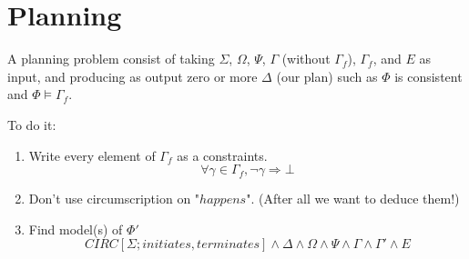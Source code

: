\section{Planning}\label{sec:planning}

A planning problem consist of taking $\Sigma$, $\Omega$, $\Psi$, $\Gamma$ (without $\Gamma_f$), $\Gamma_f$, and $E$ as input,
and producing as output zero or more $\Delta$ (our plan) such as $\Phi$ is consistent and $\Phi\models\Gamma_f$.

To do it:

\begin{enumerate}
  \item Write every element of $\Gamma_f$ as a constraints.
  \begin{equation}
    \tag{$\Gamma '$}
    \forall \gamma \in \Gamma_f, \neg \gamma \Rightarrow \bot
  \end{equation}
  \item Don't use circumscription on "$happens$". (After all we want to deduce them!)
  \item Find model(s) of $\Phi '$
  \begin{equation}
    \tag{$\Phi '$}
    CIRC[\Sigma;initiates,terminates] \land \Delta \land \Omega \land \Psi \land \Gamma \land \Gamma ' \land E
  \end{equation}
\end{enumerate}
